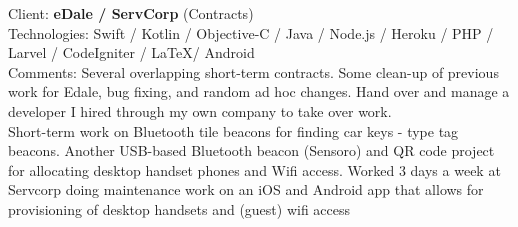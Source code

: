 \documentclass{article}
\begin{document}
% 
%
%
%
%
%
%
Client:    \textbf  { eDale / ServCorp} (Contracts)   \\
Technologies: Swift / Kotlin / Objective-C / Java / Node.js / Heroku / PHP / Larvel / CodeIgniter / \LaTeX  / Android \\

Comments: Several overlapping short-term contracts. Some clean-up of previous work for Edale, bug fixing, and random ad hoc changes.  Hand over and manage a developer I hired through my own company to take over work. \\
 Short-term work on Bluetooth tile beacons for finding car keys - type tag beacons. Another USB-based Bluetooth beacon (Sensoro) and QR code project for allocating desktop handset phones and Wifi access. Worked 3 days a week at Servcorp doing  maintenance work on an iOS and Android app that allows for provisioning of desktop handsets  and (guest) wifi access \\
\end{document}
